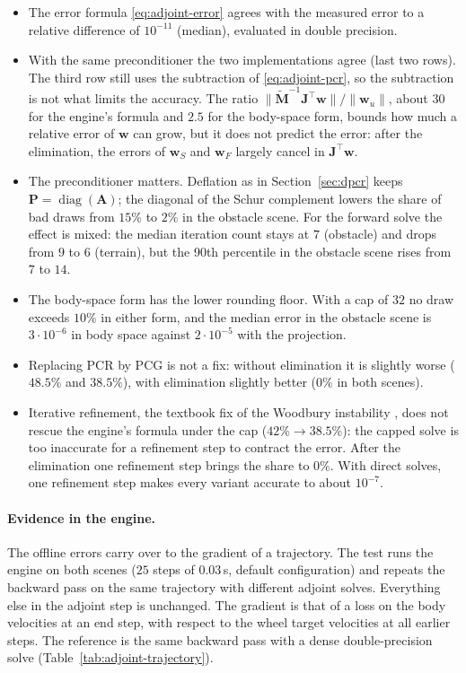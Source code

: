 \begin{itemize}
  \item The error formula \eqref{eq:adjoint-error} agrees with the
    measured error to a relative difference of $10^{-11}$ (median),
    evaluated in double precision.
  \item With the same preconditioner the two implementations agree (last
    two rows). The third row still uses the subtraction of
    \eqref{eq:adjoint-pcr}, so the subtraction is not what limits the
    accuracy. The ratio
    $\|\tilde{\mathbf{M}}^{-1}\mathbf{J}^\top\mathbf{w}\| / \|\mathbf{w}_u\|$,
    about $30$ for the engine's formula and $2.5$ for the body-space
    form, bounds how much a relative error of $\mathbf{w}$ can grow, but
    it does not predict the error: after the elimination, the errors of
    $\mathbf{w}_S$ and $\mathbf{w}_F$ largely cancel in
    $\mathbf{J}^\top\mathbf{w}$.
  \item The preconditioner matters. Deflation as in
    Section~\ref{sec:dpcr} keeps $\mathbf{P} = \operatorname{diag}(\mathbf{A})$;
    the diagonal of the Schur complement lowers the share of bad draws
    from $15\%$ to $2\%$ in the obstacle scene. For the forward solve the
    effect is mixed: the median iteration count stays at $7$ (obstacle)
    and drops from $9$ to $6$ (terrain), but the 90th percentile in the
    obstacle scene rises from $7$ to $14$.
  \item The body-space form has the lower rounding floor. With a cap of
    $32$ no draw exceeds $10\%$ in either form, and the median error in
    the obstacle scene is $3 \cdot 10^{-6}$ in body space against
    $2 \cdot 10^{-5}$ with the projection.
  \item Replacing PCR by PCG is not a fix: without elimination it is
    slightly worse ($48.5\%$ and $38.5\%$), with elimination slightly
    better ($0\%$ in both scenes).
  \item Iterative refinement, the textbook fix of the Woodbury
    instability \citep{yip1986note,hashemi2025instability}, does not
    rescue the engine's formula under the cap ($42\% \to 38.5\%$): the
    capped solve is too inaccurate for a refinement step to contract the
    error. After the elimination one refinement step brings the share to
    $0\%$. With direct solves, one refinement step makes every variant
    accurate to about $10^{-7}$.
\end{itemize}

\paragraph{Evidence in the engine.}
The offline errors carry over to the gradient of a trajectory. The test
runs the engine on both scenes ($25$ steps of $0.03$\,s, default
configuration) and repeats the backward pass on the same trajectory with
different adjoint solves. Everything else in the adjoint step is
unchanged. The gradient is that of a loss on the body velocities at an
end step, with respect to the wheel target velocities at all earlier
steps. The reference is the same backward pass with a dense
double-precision solve (Table~\ref{tab:adjoint-trajectory}).


